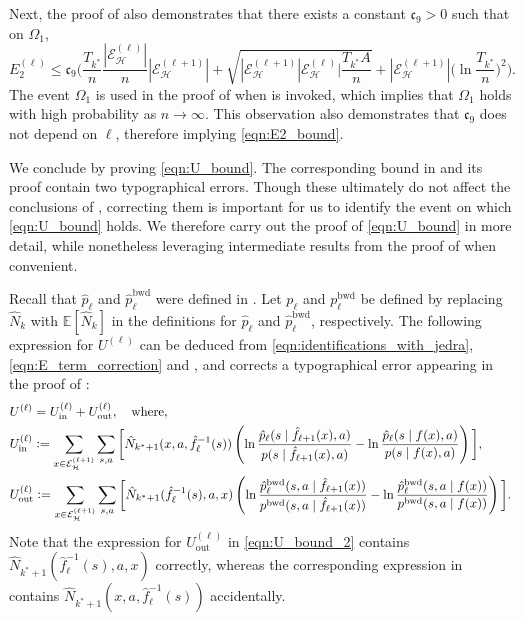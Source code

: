 \documentclass[11pt]{article}
\newcommand{\eqdef}{\vcentcolon=}
\newcommand{\mf}[1]{\mathfrak{#1}}
\newcommand{\mcE}{\mathcal{E}}
\newcommand{\mcH}{\mathcal{H}}
\newcommand{\lb}{\left(}
\newcommand{\rb}{\right)}
\newcommand{\mbbE}{\mathbb{E}}
\theoremstyle{definition}
\theoremstyle{definition}
\begin{document}
Next, the proof of \cite[Lemma 21]{Jedra:2022} also demonstrates that there exists a constant $\mf{c}_9>0$ such that on $\Omega_1$,
\begin{equation}
	E_2^{(\ell)}
	\leq
	\mf{c}_9
	\biggl(
	\frac{T_{k^*}}{n}
	\frac{|\mcE_{\mcH}^{(\ell)}|}{n}
	|\mcE_{\mcH}^{(\ell+1)}|
	+
	\sqrt{|\mcE_{\mcH}^{(\ell+1)}|\mcE_{\mcH}^{(\ell)}|\frac{T_{k^*}A}{n}}
	+
	|\mcE^{(\ell+1)}_{\mcH}|\biggl(\ln \frac{T_{k^*}}{n}\biggr)^2
	\biggr)
	.
\end{equation}
The event $\Omega_1$ is used in the proof of \cite[Lemma 21]{Jedra:2022} when \cite[Proposition 19]{Jedra:2022} is invoked, which implies that $\Omega_1$ holds with high probability as $n\rightarrow \infty$.
This observation also demonstrates that $\mf{c}_9$ does not depend on $\ell$, therefore implying \eqref{eqn:E2_bound}.

We conclude by proving \eqref{eqn:U_bound}.
The corresponding bound in \cite[Lemma 21]{Jedra:2022} and its proof contain two typographical errors.
Though these ultimately do not affect the conclusions of \cite{Jedra:2022}, correcting them is important for us to identify the event on which \eqref{eqn:U_bound} holds.
We therefore carry out the proof of \eqref{eqn:U_bound} in more detail, while nonetheless leveraging intermediate results from the proof of \cite[Lemma 21]{Jedra:2022} when convenient.

Recall that $\hat{p}_{\ell}$ and $\hat{p}_{\ell}^{\mathrm{bwd}}$ were defined in .
Let $p_{\ell}$ and $p_{\ell}^{\mathrm{bwd}}$ be defined by replacing $\hat{N}_k$ with $\mbbE[\hat{N}_k]$ in the definitions for $\hat{p}_{\ell}$ and $\hat{p}_{\ell}^{\mathrm{bwd}}$, respectively.
The following expression for $U^{(\ell)}$ can be deduced from \eqref{eqn:identifications_with_jedra}, \eqref{eqn:E_term_correction} and \cite[(87)--(89)]{Jedra:2022}, and corrects a typographical error appearing in the proof of \cite[Lemma 21]{Jedra:2022}:
\begin{align}
	 &
	U^{(\ell)}= U^{(\ell)}_{\mathrm{in}} + U^{(\ell)}_{\mathrm{out}}, \quad \mathrm{where},
	\nonumber
	\\
	 &
	U^{(\ell)}_{\mathrm{in}}
	\eqdef
	\sum_{x\in\mcE_{\mcH}^{(\ell+1)}}
	\sum_{s,a}
	\bigg[
	\hat{N}_{k^*+1}(x,a,\hat{f}_{\ell}^{-1}(s))
	\lb
	\ln\frac{\hat{p}_{\ell}(s\mid \hat{f}_{\ell+1}(x),a)}{p(s\mid \hat{f}_{\ell+1}(x),a)}
	-
	\ln\frac{\hat{p}_{\ell}(s\mid f(x),a)}{p(s\mid f(x),a)}
	\rb
	\bigg],
	\label{eqn:U_bound_2}
	\\
	 &
	U^{(\ell)}_{\mathrm{out}}
	\eqdef
	\sum_{x\in\mcE_{\mcH}^{(\ell+1)}}
	\sum_{s,a}
	\bigg[
	\hat{N}_{k^*+1}(\hat{f}_{\ell}^{-1}(s),a,x)
	\lb
	\ln \frac{\hat{p}_{\ell}^{\mathrm{bwd}}(s,a\mid \hat{f}_{\ell+1}(x))}{p^{\mathrm{bwd}}(s,a\mid \hat{f}_{\ell+1}(x))}
	-
	\ln \frac{\hat{p}_{\ell}^{\mathrm{bwd}}(s,a\mid f(x))}{p^{\mathrm{bwd}}(s,a\mid f(x))}
	\rb
	\bigg].
	\nonumber
\end{align}
Note that the expression for $U^{(\ell)}_{\mathrm{out}}$ in \eqref{eqn:U_bound_2} contains $\hat{N}_{k^*+1}(\hat{f}_{\ell}^{-1}(s),a,x)$ correctly, whereas the corresponding expression in \cite{Jedra:2022} contains $\hat{N}_{k^*+1}\allowbreak (x,a,\hat{f}_{\ell}^{-1}(s))$ accidentally.
\end{document}
